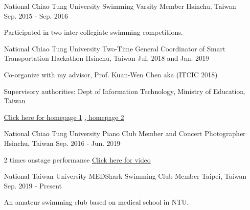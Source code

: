 

\begin{cventries}

\cventry
    {National Chiao Tung University} %
    {Swimming Varsity Member} %
    {Hsinchu, Taiwan} %
    {Sep. 2015 - Sep. 2016} %
    {
      \begin{cvitems} %
        \item {Participated in two inter-collegiate swimming competitions.}
      \end{cvitems}
    }

\cventry
    {National Chiao Tung University} %
    {Two-Time General Coordinator of Smart Transportation Hackathon} %
    {Hsinchu, Taiwan} %
    {Jul. 2018 and Jan. 2019} %
    {
      \begin{cvitems} %
        \item {Co-organize with my advisor, Prof. Kuan-Wen Chen aka (ITCIC 2018)}
        \item {Supervisory authorities: Dept of Information Technology, Ministry of Education, Taiwan}
        \item {\href{http://covis.cs.nctu.edu.tw/ITCIC2018/}{Click here for homepage 1} \href{http://covis.cs.nctu.edu.tw/ITCIC2018/}{, homepage 2}}
      \end{cvitems}
    }

\cventry
    {National Chiao Tung University} %
    {Piano Club Member and Concert Photographer} %
    {Hsinchu, Taiwan} %
    {Sep. 2016 - Jun. 2019} %
    {
      \begin{cvitems} %
        \item {2 times onstage performance \href{https://www.youtube.com/watch?v=3xeSBrs6m5w&t=2s}{Click here for video}}
      \end{cvitems}
    }
\cventry
    {National Taiwan University} %
    {MEDShark Swimming Club Member} %
    {Taipei, Taiwan} %
    {Sep. 2019 - Present} %
    {
      \begin{cvitems} %
        \item {An amateur swimming club based on medical school in NTU.}
      \end{cvitems}
    }
\end{cventries}
